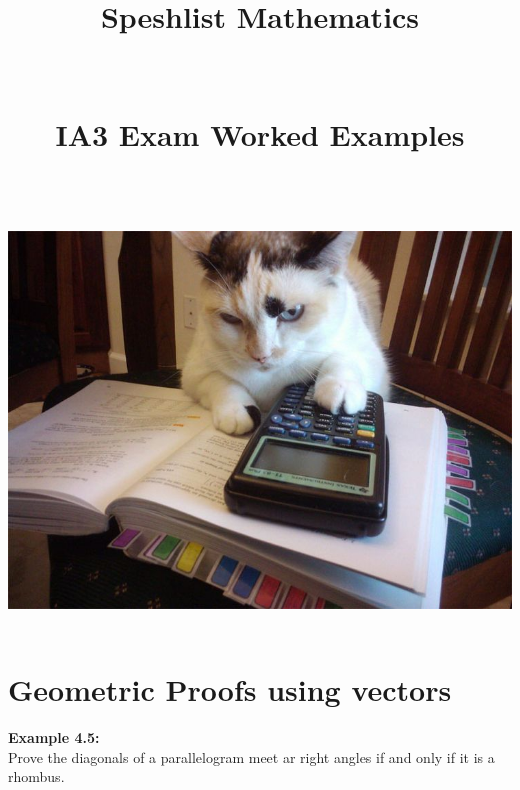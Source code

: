 \documentclass[10pt,a4paper]{article}
\newcommand{\dotline}{\noindent\makebox[\linewidth]{\dotfill}\\[1em]}
\begin{document}
	\begin{titlepage}
		\title{ \textbf{\Huge Speshlist Mathematics \\ \hfill \\ \hfill \\ IA3 Exam Worked Examples}}
		\date{\hfill	\\ \hfill \\ \hfill \\ \hfill	\includegraphics[width=0.8\paperwidth]{cat.png}}

	\end{titlepage}
	\clearpage
	\maketitle
	\thispagestyle{empty}

	\newpage
	\section{Geometric Proofs using vectors}
	\pagestyle{fancy}
	 
\textbf{\textcolor{OliveGreen}{Example 4.5}:}\\
Prove the diagonals of a parallelogram meet ar right angles if and only if it is a rhombus.\\

\dotline
\dotline
\dotline
\dotline
\dotline
\dotline
\dotline
\dotline
\dotline
\dotline
\dotline
\dotline
\dotline
\dotline
\dotline
\dotline
\dotline
\dotline
\dotline
\dotline
\dotline
\dotline
\dotline
\dotline
\dotline
\dotline
\dotline
\dotline
\end{document}

